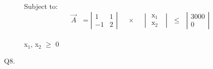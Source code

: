 \documentclass[10pt]{csc_assignment}
\begin{document}
\begin{description}
Subject to: \\

\[\text{$\vec{A}$ } = \left| \begin{array}{cc}
1 & 1  \\
-1 & 2 \end{array} \right|
\text{~~~ $\times$ ~~~}
\left| \begin{array}{cc}
\text{ x$_{1}$ }  \\
\text{ x$_{2}$ } \end{array} \right|
\text{ $\leqslant$ }
\left| \begin{array}{c}
3000  \\
0 \end{array} \right|
 \] \\
\hspace*{4.5cm} x$_{1}$, x$_{2}$ $\geqslant$ 0\\




\newpage
\item[Q8.]

\end{description}
\end{document}
